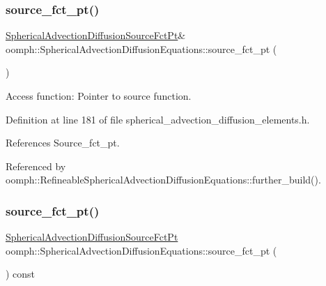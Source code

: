 \subsubsection{\texorpdfstring{source\+\_\+fct\+\_\+pt()}{source\_fct\_pt()}\hspace{0.1cm}{\footnotesize\ttfamily [1/2]}}
{\footnotesize\ttfamily \hyperlink{classoomph_1_1SphericalAdvectionDiffusionEquations_aa02d787c43f88e46ad5e21c7b299b5cb}{Spherical\+Advection\+Diffusion\+Source\+Fct\+Pt}\& oomph\+::\+Spherical\+Advection\+Diffusion\+Equations\+::source\+\_\+fct\+\_\+pt (\begin{DoxyParamCaption}{ }\end{DoxyParamCaption})\hspace{0.3cm}{\ttfamily [inline]}}



Access function\+: Pointer to source function. 



Definition at line 181 of file spherical\+\_\+advection\+\_\+diffusion\+\_\+elements.\+h.



References Source\+\_\+fct\+\_\+pt.



Referenced by oomph\+::\+Refineable\+Spherical\+Advection\+Diffusion\+Equations\+::further\+\_\+build().

\mbox{\label{classoomph_1_1SphericalAdvectionDiffusionEquations_a9c4d749b66acb943eac37478584683aa}} 
\subsubsection{\texorpdfstring{source\+\_\+fct\+\_\+pt()}{source\_fct\_pt()}\hspace{0.1cm}{\footnotesize\ttfamily [2/2]}}
{\footnotesize\ttfamily \hyperlink{classoomph_1_1SphericalAdvectionDiffusionEquations_aa02d787c43f88e46ad5e21c7b299b5cb}{Spherical\+Advection\+Diffusion\+Source\+Fct\+Pt} oomph\+::\+Spherical\+Advection\+Diffusion\+Equations\+::source\+\_\+fct\+\_\+pt (\begin{DoxyParamCaption}{ }\end{DoxyParamCaption}) const\hspace{0.3cm}{\ttfamily [inline]}}



